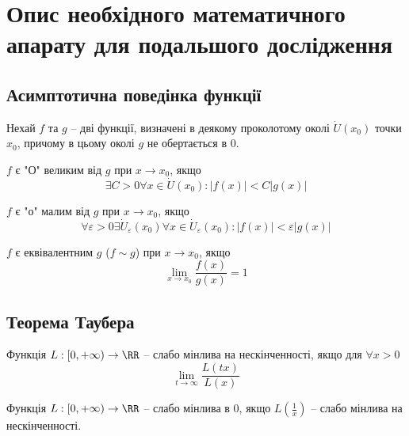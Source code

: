 \section{Опис необхідного математичного апарату для подальшого дослідження}
\jointitles

\subsection{Асимптотична поведінка функції}

Нехай $f$ та $g$ – дві функції, визначені в деякому проколотому околі $\dot U (x_0)$ точки $x_0$, причому в цьому околі $g$ не обертається в $0$.

\begin{defin}
	$f$ є "О" великим від $g$ \cite{AsymptoticsWiki} при $x \rightarrow x_0$, якщо
	\begin{equation}
		\exists C > 0\forall x \in \dot U (x_0): |f(x)| < C|g(x)|
	\end{equation}
\end{defin}

\begin{defin}
	$f$ є "о" малим від $g$ \cite{AsymptoticsWiki} при $x \rightarrow x_0$, якщо
	\begin{equation}
		\forall \varepsilon > 0 \exists \dot U_{\varepsilon} (x_0) \forall x \in \dot U_{\varepsilon} (x_0): |f(x)| < \varepsilon |g(x)|
	\end{equation}
\end{defin}

\begin{defin}
	$f$ є еквівалентним $g$ \cite{AsymptoticsWiki} ($f \sim g$) при $x \rightarrow x_0$, якщо
	$$\lim_{x \rightarrow x_0} \frac{f(x)}{g(x)} = 1$$
\end{defin}

\subsection{Теорема Таубера}

\begin{defin}
Функція $L:[0, +\infty) \rightarrow \RR$ – слабо мінлива на нескінченності,
якщо для $\forall x > 0$
$$\lim_{t \rightarrow \infty}\frac{L(tx)}{L(x)}$$
\end{defin}

\begin{defin}
Функція $L:[0, +\infty) \rightarrow \RR$ – слабо мінлива в 0,
якщо $L(\frac{1}{x})$ – слабо мінлива на нескінченності.
\end{defin}

